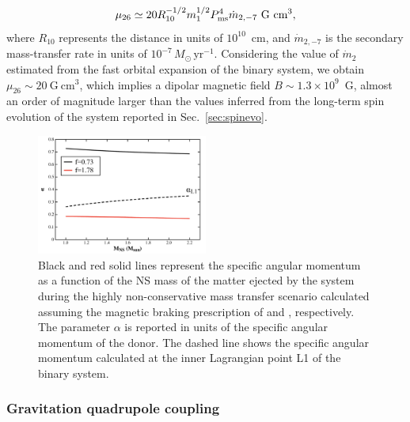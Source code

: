 \documentclass[fleqn,usenatbib]{mnras}
\begin{document}
\begin{equation}           
\mu_{26}\simeq20 R^{-1/2}_{10} m_1^{1/2}P^4_{\rm ms}\dot{m}_{2,-7} ~\text{G}~\text{cm}^3,
\end{equation}
where $R_{10}$ represents the distance in units of $10^{10}$~cm, and $\dot{m}_{2,-7}$ is the secondary mass-transfer rate in units of $10^{-7}\,{M}_\odot\,\text{yr}^{-1}$. Considering the value of $\dot{m}_2$ estimated from the fast orbital expansion of the binary system, we obtain $\mu_{26}\sim 20~\text{G}~\text{cm}^3$, which implies a dipolar magnetic field $B\sim 1.3\times 10^9$~G, almost an order of magnitude larger than the values inferred from the long-term spin evolution of the system reported in Sec.~\ref{sec:spinevo}.
\begin{figure}
\centering
\includegraphics[width=0.5\textwidth]{alpha_vs_m1_non_conservative}
\caption{Black and red solid lines represent the specific angular momentum as a function of the NS mass of the matter ejected by the system during the highly non-conservative mass transfer scenario calculated assuming the magnetic braking prescription of \citet[][f=0.73]{Skumanich:1972vy} and \citet[][f=1.78]{Smith:1979vn}, respectively. The parameter $\alpha$ is reported in units of the specific angular momentum of the donor. The dashed line shows the specific angular momentum calculated at the inner Lagrangian point L1 of the binary system.}
\label{fig:alpha}
\end{figure} 


\subsubsection*{Gravitation quadrupole coupling} 
\end{document}
